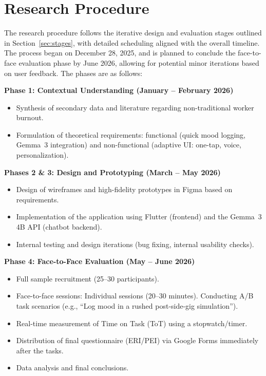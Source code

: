 \section{Research Procedure}

The research procedure follows the iterative design and evaluation stages outlined in Section~\ref{sec:stages}, with detailed scheduling aligned with the overall timeline. The process began on December 28, 2025, and is planned to conclude the face-to-face evaluation phase by June 2026, allowing for potential minor iterations based on user feedback. The phases are as follows:

\textbf{Phase 1: Contextual Understanding (January -- February 2026)}
\begin{itemize}
    \item Synthesis of secondary data and literature regarding non-traditional worker burnout.
    \item Formulation of theoretical requirements: functional (quick mood logging, Gemma~3 integration) and non-functional (adaptive UI: one-tap, voice, personalization).
\end{itemize}

\textbf{Phases 2 \& 3: Design and Prototyping (March -- May 2026)}
\begin{itemize}
    \item Design of wireframes and high-fidelity prototypes in Figma based on requirements.
    \item Implementation of the application using Flutter (frontend) and the Gemma~3 4B API (chatbot backend).
    \item Internal testing and design iterations (bug fixing, internal usability checks).
\end{itemize}

\textbf{Phase 4: Face-to-Face Evaluation (May -- June 2026)}
\begin{itemize}
    \item Full sample recruitment (25--30 participants).
    \item Face-to-face sessions: Individual sessions (20--30 minutes). Conducting A/B task scenarios (e.g., ``Log mood in a rushed post-side-gig simulation'').
    \item Real-time measurement of Time on Task (ToT) using a stopwatch/timer.
    \item Distribution of final questionnaire (ERI/PEI) via Google Forms immediately after the tasks.
    \item Data analysis and final conclusions.
\end{itemize}

